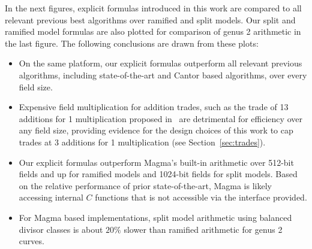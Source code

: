 In the next figures, explicit formulas introduced in this work are compared to
all relevant previous best algorithms over ramified and split models. Our split
and ramified model formulas are also plotted for comparison of genus 2
arithmetic in the last figure. The following conclusions are drawn from these plots:
\begin{itemize}
    \item On the same platform, our explicit formulas outperform all relevant
    previous algorithms, including state-of-the-art and Cantor based algorithms,
    over every field size.

    \item Expensive field multiplication for addition trades, such as the trade
    of 13 additions for 1 multiplication proposed
    in~\cite{CostelloLauter_geo_2011} are detrimental for efficiency over any
    field size, providing evidence for the design choices of this work to cap
    trades at 3 additions for 1 multiplication (see Section~\ref{sec:trades}).
     
    \item Our explicit formulas outperform Magma's built-in arithmetic over
    512-bit fields and up for ramified models and 1024-bit fields for split
    models. Based on the relative performance of prior state-of-the-art, Magma
    is likely accessing internal $C$ functions that is not accessible via the
    interface provided.

    \item For Magma based implementations, split model arithmetic using balanced
    divisor classes is about $20\%$ slower than ramified arithmetic for genus 2
    curves. 
\end{itemize}

